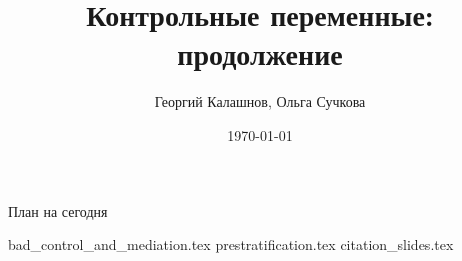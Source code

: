 \title{Контрольные переменные: продолжение}
\author[Георгий Калашнов, Ольга Сучкова]{Георгий Калашнов, Ольга Сучкова}
\date{\today}



\begin{frame}
  \titlepage
  \begin{flushright}
  \end{flushright}
\end{frame}


\begin{frame}{План на сегодня} 
\tableofcontents
\end{frame}

{bad_control_and_mediation.tex}
{prestratification.tex}
{citation_slides.tex}

